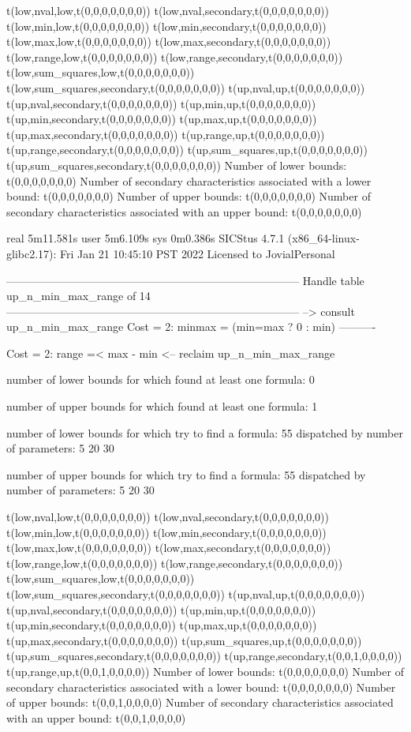 t(low,nval,low,t(0,0,0,0,0,0,0))
t(low,nval,secondary,t(0,0,0,0,0,0,0))
t(low,min,low,t(0,0,0,0,0,0,0))
t(low,min,secondary,t(0,0,0,0,0,0,0))
t(low,max,low,t(0,0,0,0,0,0,0))
t(low,max,secondary,t(0,0,0,0,0,0,0))
t(low,range,low,t(0,0,0,0,0,0,0))
t(low,range,secondary,t(0,0,0,0,0,0,0))
t(low,sum_squares,low,t(0,0,0,0,0,0,0))
t(low,sum_squares,secondary,t(0,0,0,0,0,0,0))
t(up,nval,up,t(0,0,0,0,0,0,0))
t(up,nval,secondary,t(0,0,0,0,0,0,0))
t(up,min,up,t(0,0,0,0,0,0,0))
t(up,min,secondary,t(0,0,0,0,0,0,0))
t(up,max,up,t(0,0,0,0,0,0,0))
t(up,max,secondary,t(0,0,0,0,0,0,0))
t(up,range,up,t(0,0,0,0,0,0,0))
t(up,range,secondary,t(0,0,0,0,0,0,0))
t(up,sum_squares,up,t(0,0,0,0,0,0,0))
t(up,sum_squares,secondary,t(0,0,0,0,0,0,0))
Number of lower bounds:                                             t(0,0,0,0,0,0,0)
Number of secondary characteristics associated with a lower bound:  t(0,0,0,0,0,0,0)
Number of upper bounds:                                             t(0,0,0,0,0,0,0)
Number of secondary characteristics associated with an upper bound: t(0,0,0,0,0,0,0)

real	5m11.581s
user	5m6.109s
sys	0m0.386s
SICStus 4.7.1 (x86_64-linux-glibc2.17): Fri Jan 21 10:45:10 PST 2022
Licensed to JovialPersonal


--------------------------------------------------------------------------------
Handle table up_n_min_max_range of 14
--------------------------------------------------------------------------------
--> consult up_n_min_max_range
Cost =  2:  minmax = (min=max ? 0 : min)
----------

Cost =  2:  range =< max - min
<-- reclaim up_n_min_max_range

number of lower bounds for which found at least one formula: 0

number of upper bounds for which found at least one formula: 1

number of lower bounds for which try to find a formula: 55
dispatched by number of parameters: 5  20  30

number of upper bounds for which try to find a formula: 55
dispatched by number of parameters: 5  20  30

t(low,nval,low,t(0,0,0,0,0,0,0))
t(low,nval,secondary,t(0,0,0,0,0,0,0))
t(low,min,low,t(0,0,0,0,0,0,0))
t(low,min,secondary,t(0,0,0,0,0,0,0))
t(low,max,low,t(0,0,0,0,0,0,0))
t(low,max,secondary,t(0,0,0,0,0,0,0))
t(low,range,low,t(0,0,0,0,0,0,0))
t(low,range,secondary,t(0,0,0,0,0,0,0))
t(low,sum_squares,low,t(0,0,0,0,0,0,0))
t(low,sum_squares,secondary,t(0,0,0,0,0,0,0))
t(up,nval,up,t(0,0,0,0,0,0,0))
t(up,nval,secondary,t(0,0,0,0,0,0,0))
t(up,min,up,t(0,0,0,0,0,0,0))
t(up,min,secondary,t(0,0,0,0,0,0,0))
t(up,max,up,t(0,0,0,0,0,0,0))
t(up,max,secondary,t(0,0,0,0,0,0,0))
t(up,sum_squares,up,t(0,0,0,0,0,0,0))
t(up,sum_squares,secondary,t(0,0,0,0,0,0,0))
t(up,range,secondary,t(0,0,1,0,0,0,0))
t(up,range,up,t(0,0,1,0,0,0,0))
Number of lower bounds:                                             t(0,0,0,0,0,0,0)
Number of secondary characteristics associated with a lower bound:  t(0,0,0,0,0,0,0)
Number of upper bounds:                                             t(0,0,1,0,0,0,0)
Number of secondary characteristics associated with an upper bound: t(0,0,1,0,0,0,0)

